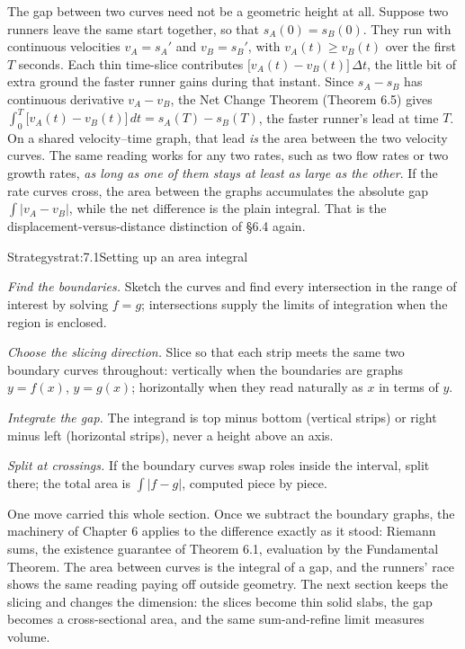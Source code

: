 \documentclass[a4paper,12pt,oneside]{memoir}
\begin{document}
The gap between two curves need not be a geometric height at all. Suppose two runners leave the same start together, so that \(s_{A}(0) = s_{B}(0)\). They run with continuous velocities \(v_{A} = s_{A}'\) and \(v_{B} = s_{B}'\), with \(v_{A}(t) \ge v_{B}(t)\) over the first \(T\) seconds. Each thin time-slice contributes \(\bigl[v_{A}(t) - v_{B}(t)\bigr]\,\Delta t\), the little bit of extra ground the faster runner gains during that instant. Since \(s_{A} - s_{B}\) has continuous derivative \(v_{A} - v_{B}\), the Net Change Theorem (Theorem 6.5) gives \(\int_{0}^{T} \bigl[v_{A}(t) - v_{B}(t)\bigr]\,dt = s_{A}(T) - s_{B}(T)\), the faster runner’s lead at time \(T\). On a shared velocity–time graph, that lead \emph{is} the area between the two velocity curves. The same reading works for any two rates, such as two flow rates or two growth rates, \emph{as long as one of them stays at least as large as the other}. If the rate curves cross, the area between the graphs accumulates the absolute gap \(\int \lvert v_{A} - v_{B}\rvert\), while the net difference is the plain integral. That is the displacement-versus-distance distinction of §6.4 again.

\begin{envstrategy}{Strategy}{strat:7.1}{Setting up an area integral}
\begin{steps}
  \item \emph{Find the boundaries.} Sketch the curves and find every intersection in the range of interest by solving \(f = g\); intersections supply the limits of integration when the region is enclosed.
  \item \emph{Choose the slicing direction.} Slice so that each strip meets the same two boundary curves throughout: vertically when the boundaries are graphs \(y = f(x)\), \(y = g(x)\); horizontally when they read naturally as \(x\) in terms of \(y\).
  \item \emph{Integrate the gap.} The integrand is top minus bottom (vertical strips) or right minus left (horizontal strips), never a height above an axis.
  \item \emph{Split at crossings.} If the boundary curves swap roles inside the interval, split there; the total area is \(\int \lvert f - g\rvert\), computed piece by piece.
\end{steps}
\end{envstrategy}
One move carried this whole section. Once we subtract the boundary graphs, the machinery of Chapter 6 applies to the difference exactly as it stood: Riemann sums, the existence guarantee of Theorem 6.1, evaluation by the Fundamental Theorem. The area between curves is the integral of a gap, and the runners’ race shows the same reading paying off outside geometry. The next section keeps the slicing and changes the dimension: the slices become thin solid slabs, the gap becomes a cross-sectional area, and the same sum-and-refine limit measures volume.
\end{document}
